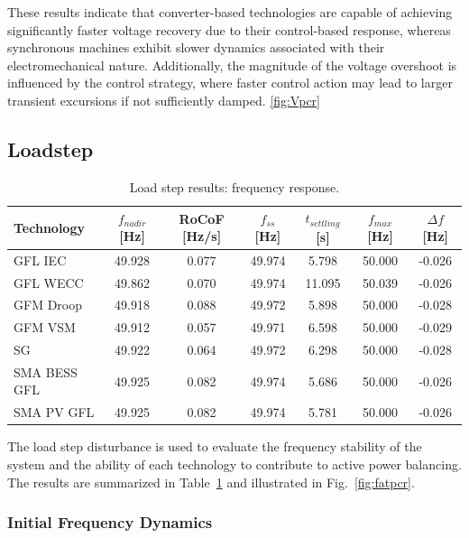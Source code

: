 These results indicate that converter-based technologies are capable of achieving significantly faster voltage recovery due to their control-based response, whereas synchronous machines exhibit slower dynamics associated with their electromechanical nature. Additionally, the magnitude of the voltage overshoot is influenced by the control strategy, where faster control action may lead to larger transient excursions if not sufficiently damped. \ref{fig:Vpcr}





\newpage
\subsection{Loadstep}
\begin{table}[htbp]
\centering
\footnotesize
\caption{Load step results: frequency response.}
\begin{tabular}{lcccccc}
\toprule
Technology & $f_{nadir}$ [Hz] & RoCoF [Hz/s] & $f_{ss}$ [Hz] & $t_{settling}$ [s] & $f_{max}$ [Hz] & $\Delta f$ [Hz] \\
\midrule
GFL IEC        & 49.928 & 0.077 & 49.974 & 5.798  & 50.000 & -0.026 \\
GFL WECC       & 49.862 & 0.070 & 49.974 & 11.095 & 50.039 & -0.026 \\
GFM Droop      & 49.918 & 0.088 & 49.972 & 5.898  & 50.000 & -0.028 \\
GFM VSM        & 49.912 & 0.057 & 49.971 & 6.598  & 50.000 & -0.029 \\
SG              & 49.922 & 0.064 & 49.972 & 6.298  & 50.000 & -0.028 \\
SMA BESS GFL  & 49.925 & 0.082 & 49.974 & 5.686  & 50.000 & -0.026 \\
SMA PV GFL    & 49.925 & 0.082 & 49.974 & 5.781  & 50.000 & -0.026 \\
\bottomrule
\end{tabular}
\label{tab:loadstep_frequency}
\end{table}


The load step disturbance is used to evaluate the frequency stability of the system and the ability of each technology to contribute to active power balancing. The results are summarized in Table~\ref{tab:loadstep_frequency} and illustrated in Fig.~\ref{fig:fatpcr}.

\subsubsection{Initial Frequency Dynamics}

